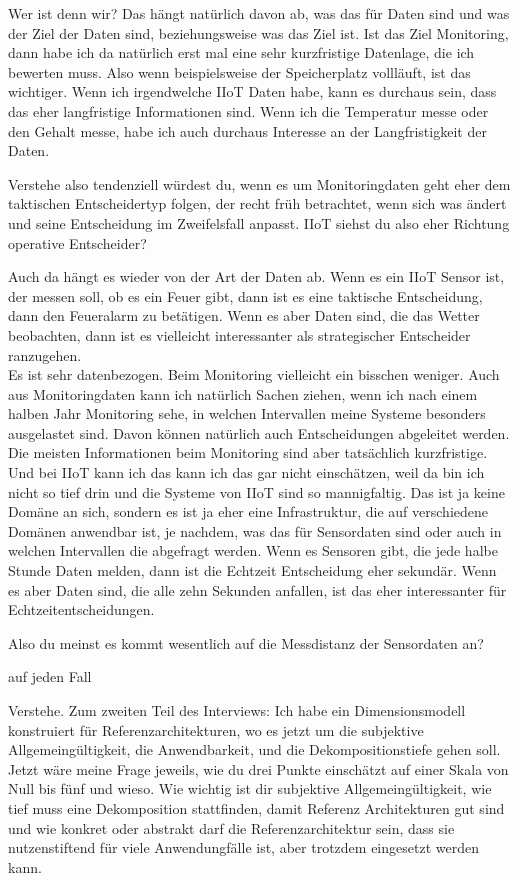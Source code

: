 \PA	 Wer ist denn wir? Das hängt natürlich davon ab, was das für Daten sind und was der Ziel der Daten sind, beziehungsweise was das Ziel ist. Ist das Ziel Monitoring, dann habe ich da natürlich erst mal eine sehr kurzfristige Datenlage, die ich bewerten muss. Also wenn beispielsweise der Speicherplatz vollläuft, ist das wichtiger. Wenn ich irgendwelche \ac{IIoT} Daten habe, kann es durchaus sein, dass das eher langfristige Informationen sind. Wenn ich die Temperatur messe oder den \coo{} Gehalt messe, habe ich auch durchaus Interesse an der Langfristigkeit der Daten.

\LF	 Verstehe also tendenziell würdest du, wenn es um Monitoringdaten geht eher dem taktischen Entscheidertyp folgen, der recht früh betrachtet, wenn sich was ändert und seine Entscheidung im Zweifelsfall anpasst. \ac{IIoT} siehst du also eher Richtung operative Entscheider?

\PA	Auch da hängt es wieder von der Art der Daten ab. Wenn es ein \ac{IIoT} Sensor ist, der messen soll, ob es ein Feuer gibt, dann ist es eine taktische Entscheidung, dann den Feueralarm zu betätigen. Wenn es aber Daten sind, die das Wetter beobachten, dann ist es vielleicht interessanter als strategischer Entscheider ranzugehen. \\
Es ist sehr datenbezogen. Beim Monitoring vielleicht ein bisschen weniger. Auch aus Monitoringdaten kann ich natürlich Sachen ziehen, wenn ich nach einem halben Jahr Monitoring sehe, in welchen Intervallen meine Systeme besonders ausgelastet sind. Davon können natürlich auch Entscheidungen abgeleitet werden. Die meisten Informationen beim Monitoring sind aber tatsächlich kurzfristige. Und bei \ac{IIoT} kann ich das kann ich das gar nicht einschätzen, weil da bin ich nicht so tief drin und die Systeme von \ac{IIoT} sind so mannigfaltig. Das ist ja keine Domäne an sich, sondern es ist ja eher eine Infrastruktur, die auf verschiedene Domänen anwendbar ist, je nachdem, was das für Sensordaten sind oder auch in welchen Intervallen die abgefragt werden. Wenn es Sensoren gibt, die jede halbe Stunde Daten melden, dann ist die Echtzeit Entscheidung eher sekundär. Wenn es aber Daten sind, die alle zehn Sekunden anfallen, ist das eher interessanter für Echtzeitentscheidungen.

\LF	 Also du meinst es kommt wesentlich auf die Messdistanz der Sensordaten an?

\PA	 auf jeden Fall

\LF	 Verstehe. Zum zweiten Teil des Interviews: Ich habe ein Dimensionsmodell konstruiert für Referenzarchitekturen, wo es jetzt um die subjektive Allgemeingültigkeit, die Anwendbarkeit, und die Dekompositionstiefe gehen soll. Jetzt wäre meine Frage jeweils, wie du drei Punkte einschätzt auf einer Skala von Null bis fünf und wieso. Wie wichtig ist dir subjektive Allgemeingültigkeit, wie tief muss eine Dekomposition stattfinden, damit Referenz Architekturen gut sind und wie konkret oder abstrakt darf die Referenzarchitektur sein, dass sie nutzenstiftend für viele Anwendungfälle ist, aber trotzdem eingesetzt werden kann.


